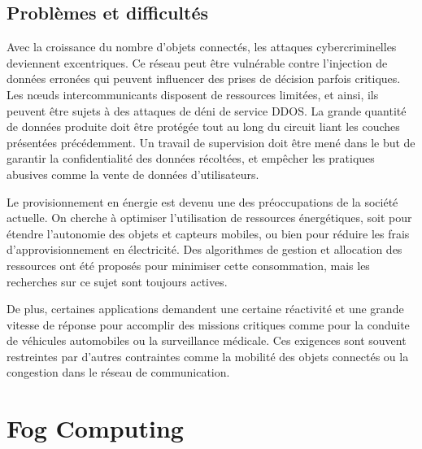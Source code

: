 \subsection{Problèmes et difficultés}
Avec la croissance du nombre d'objets connectés, les attaques cybercriminelles deviennent excentriques. Ce réseau peut être vulnérable contre l'injection de données erronées qui peuvent influencer des prises de décision parfois critiques. Les nœuds intercommunicants disposent de ressources limitées, et ainsi, ils peuvent être sujets à des attaques de déni de service DDOS. La grande quantité de données produite doit être protégée tout au long du circuit liant les couches présentées précédemment. Un travail de supervision doit être mené dans le but de garantir la confidentialité des données récoltées, et empêcher les pratiques abusives comme la vente de données d'utilisateurs.\par
Le provisionnement en énergie est devenu une des préoccupations de la société actuelle. On cherche à optimiser l'utilisation de ressources énergétiques, soit pour étendre l'autonomie des objets et capteurs mobiles, ou bien pour réduire les frais d'approvisionnement en électricité. Des algorithmes de gestion et allocation des ressources ont été proposés pour minimiser cette consommation, mais les recherches sur ce sujet sont toujours actives.\par
De plus, certaines applications demandent une certaine réactivité et une grande vitesse de réponse pour accomplir des missions critiques comme pour la conduite de véhicules automobiles ou la surveillance médicale. Ces exigences sont souvent restreintes par d'autres contraintes comme la mobilité des objets connectés ou la congestion dans le réseau de communication.
\section{Fog Computing}

